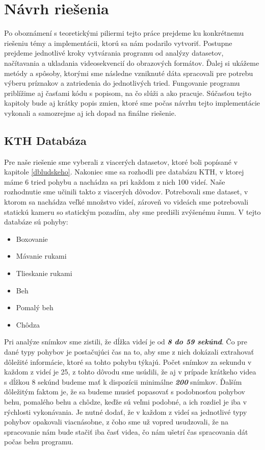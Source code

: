 \newpage

\section{Návrh riešenia}
Po oboznámení s teoretickými piliermi tejto práce prejdeme ku konkrétnemu riešeniu témy a implementácii, ktorú sa nám podarilo vytvoriť. Postupne prejdeme jednotlivé kroky vytvárania programu od analýzy datasetov, načítavania a ukladania videosekvencií do obrazových formátov. Ďalej si ukážeme metódy a spôsoby, ktorými sme následne vzniknuté dáta spracovali pre potrebu výberu príznakov a zatriedenia do jednotlivých tried. Fungovanie programu priblížime aj časťami kódu s popisom, na čo slúži a ako pracuje. Súčasťou tejto kapitoly bude aj krátky popis zmien, ktoré sme počas návrhu tejto implementácie vykonali a samozrejme aj ich dopad na finálne riešenie.

\subsection{KTH Databáza}
Pre naše riešenie sme vyberali z viacerých datasetov, ktoré boli popísané v kapitole \ref{dbludskeho}. Nakoniec sme sa rozhodli pre databázu KTH, v ktorej máme 6 tried pohybu a nachádza sa pri každom z nich 100 videí. Naše rozhodnutie sme učinili takto z viacerých dôvodov. Potrebovali sme dataset, v ktorom sa nachádza veľké množstvo videí, zároveň vo videách sme potrebovali statickú kameru so statickým pozadím, aby sme predišli zvýšenému šumu. V tejto databáze sú pohyby:

\begin{itemize}
\item Boxovanie
\item Mávanie rukami
\item Tlieskanie rukami
\item Beh
\item Pomalý beh
\item Chôdza
\end{itemize}

Pri analýze snímkov sme zistili, že dĺžka videí je od \textit{\textbf{8 do 59 sekúnd}}. Čo pre dané typy pohybov je postačujúci čas na to, aby sme z nich dokázali extrahovať dôležité informácie, ktoré sa tohto pohybu týkajú.  Počet snímkov za sekundu v každom z videí je 25, z tohto dôvodu sme usúdili, že aj v prípade krátkeho videa s dĺžkou 8 sekúnd budeme mať k dispozícii minimálne \textit{\textbf{200}} snímkov. Ďalším dôležitým faktom je, že sa budeme musieť popasovať s podobnosťou pohybov behu, pomalého behu a chôdze, keďže sú veľmi podobné, a ich rozdiel je iba v rýchlosti vykonávania. Je nutné dodať, že v každom z videí sa jednotlivé typy pohybov opakovali viacnásobne, z čoho sme už vopred usudzovali, že na spracovanie nám bude stačiť iba časť videa, čo nám ušetrí čas spracovania dát počas behu programu. 

